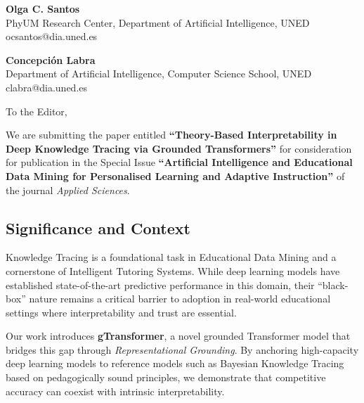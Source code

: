 \documentclass[10pt]{article}
\begin{document}
\begin{raggedright}

\textbf{Olga C. Santos} \\
PhyUM Research Center, Department of Artificial Intelligence, UNED \\
ocsantos@dia.uned.es \\

\vspace{0.2cm}

\textbf{Concepción Labra} \\
Department of Artificial Intelligence, Computer Science School, UNED \\
clabra@dia.uned.es \\

\end{raggedright}

\vspace{0.4cm}

\noindent
To the Editor,

\vspace{0.4cm}

\noindent

We are submitting the paper entitled \textbf{``Theory-Based Interpretability in Deep Knowledge Tracing via Grounded Transformers''} for consideration for publication in the Special Issue \textbf{``Artificial Intelligence and Educational Data Mining for Personalised Learning and Adaptive Instruction''} of the journal \textit{Applied Sciences}.

\subsection*{Significance and Context}
Knowledge Tracing is a foundational task in Educational Data Mining and a cornerstone of Intelligent Tutoring Systems. While deep learning models have established state-of-the-art predictive performance in this domain, their ``black-box'' nature remains a critical barrier to adoption in real-world educational settings where interpretability and trust are essential. 

Our work introduces \textbf{gTransformer}, a novel grounded Transformer model that bridges this gap through \textit{Representational Grounding}. By anchoring high-capacity deep learning models to reference models such as Bayesian Knowledge Tracing based on pedagogically sound principles, we demonstrate that competitive accuracy can coexist with intrinsic interpretability.
\end{document}
